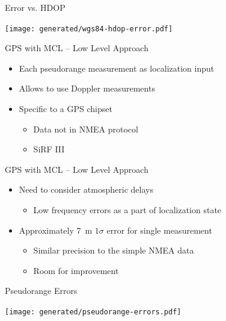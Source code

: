 \documentclass[utf8,12pt]{beamer}
\begin{document}
\begin{frame}[plain]{Error vs. HDOP}
\begin{center}
\centerline{\texttt{[image: generated/wgs84-hdop-error.pdf]}}
\end{center}
\end{frame}

\begin{frame}{GPS with MCL -- Low Level Approach}
    \begin{itemize}
        \item Each pseudorange measurement as localization input
        \item Allows to use Doppler measurements
        \item Specific to a GPS chipset
        \begin{itemize}
            \item Data not in NMEA protocol
            \item SiRF III
        \end{itemize}
    \end{itemize}
\end{frame}

\begin{frame}{GPS with MCL -- Low Level Approach}
    \begin{itemize}
        \item Need to consider atmospheric delays
        \begin{itemize}
            \item Low frequency errors as a part of localization state
        \end{itemize}
        \item Approximately \SI{7}{\meter} \(1\sigma\) error for single measurement
        \begin{itemize}
            \item Similar precision to the simple NMEA data
            \item Room for improvement
        \end{itemize}
    \end{itemize}
\end{frame}

\begin{frame}[plain]{Pseudorange Errors}
\begin{center}
\centerline{\texttt{[image: generated/pseudorange-errors.pdf]}}
\end{center}
\end{frame}
\end{document}
